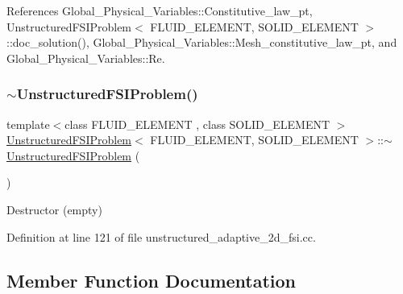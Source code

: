 References Global\+\_\+\+Physical\+\_\+\+Variables\+::\+Constitutive\+\_\+law\+\_\+pt, Unstructured\+F\+S\+I\+Problem$<$ F\+L\+U\+I\+D\+\_\+\+E\+L\+E\+M\+E\+N\+T, S\+O\+L\+I\+D\+\_\+\+E\+L\+E\+M\+E\+N\+T $>$\+::doc\+\_\+solution(), Global\+\_\+\+Physical\+\_\+\+Variables\+::\+Mesh\+\_\+constitutive\+\_\+law\+\_\+pt, and Global\+\_\+\+Physical\+\_\+\+Variables\+::\+Re.

\mbox{\label{classUnstructuredFSIProblem_a976a81e0dee902f6713bd8ca4d79d000}} 
\subsubsection{\texorpdfstring{$\sim$\+Unstructured\+F\+S\+I\+Problem()}{~UnstructuredFSIProblem()}}
{\footnotesize\ttfamily template$<$class F\+L\+U\+I\+D\+\_\+\+E\+L\+E\+M\+E\+NT , class S\+O\+L\+I\+D\+\_\+\+E\+L\+E\+M\+E\+NT $>$ \\
\hyperlink{classUnstructuredFSIProblem}{Unstructured\+F\+S\+I\+Problem}$<$ F\+L\+U\+I\+D\+\_\+\+E\+L\+E\+M\+E\+NT, S\+O\+L\+I\+D\+\_\+\+E\+L\+E\+M\+E\+NT $>$\+::$\sim$\hyperlink{classUnstructuredFSIProblem}{Unstructured\+F\+S\+I\+Problem} (\begin{DoxyParamCaption}{ }\end{DoxyParamCaption})\hspace{0.3cm}{\ttfamily [inline]}}



Destructor (empty) 



Definition at line 121 of file unstructured\+\_\+adaptive\+\_\+2d\+\_\+fsi.\+cc.



\subsection{Member Function Documentation}
\mbox{\label{classUnstructuredFSIProblem_ae91b90874744a5eb1870da3873841e09}} 
